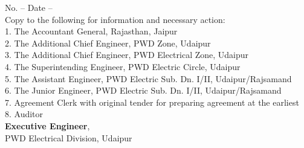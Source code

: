 \documentclass[a4paper]{article}
\begin{document}
No. -- \hspace{45mm} Date -- \\
Copy to the following for information and necessary action: \\
1. The Accountant General, Rajasthan, Jaipur \\
2. The Additional Chief Engineer, PWD Zone, Udaipur \\
3. The Additional Chief Engineer, PWD Electrical Zone, Udaipur \\
4. The Superintending Engineer, PWD Electric Circle, Udaipur \\
5. The Assistant Engineer, PWD Electric Sub. Dn. I/II, Udaipur/Rajsamand \\
6. The Junior Engineer, PWD Electric Sub. Dn. I/II, Udaipur/Rajsamand \\
7. Agreement Clerk with original tender for preparing agreement at the earliest \\
8. Auditor \\

\textbf{Executive Engineer}, \\
PWD Electrical Division, Udaipur
\end{document}
